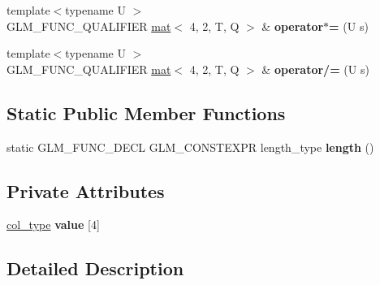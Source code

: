 \begin{DoxyCompactItemize}
\item 
\mbox{\label{structglm_1_1mat_3_014_00_012_00_01T_00_01Q_01_4_aca18c66a3af57e5d99e420867c77792a}} 
{\footnotesize template$<$typename U $>$ }\\G\+L\+M\+\_\+\+F\+U\+N\+C\+\_\+\+Q\+U\+A\+L\+I\+F\+I\+ER \hyperlink{structglm_1_1mat}{mat}$<$ 4, 2, T, Q $>$ \& {\bfseries operator$\ast$=} (U s)
\item 
\mbox{\label{structglm_1_1mat_3_014_00_012_00_01T_00_01Q_01_4_a654375437f4f6433308f1e41e5482c8f}} 
{\footnotesize template$<$typename U $>$ }\\G\+L\+M\+\_\+\+F\+U\+N\+C\+\_\+\+Q\+U\+A\+L\+I\+F\+I\+ER \hyperlink{structglm_1_1mat}{mat}$<$ 4, 2, T, Q $>$ \& {\bfseries operator/=} (U s)
\end{DoxyCompactItemize}
\subsection*{Static Public Member Functions}
\begin{DoxyCompactItemize}
\item 
\mbox{\label{structglm_1_1mat_3_014_00_012_00_01T_00_01Q_01_4_ab3b1d2d2d45c52698509f170c3e0d866}} 
static G\+L\+M\+\_\+\+F\+U\+N\+C\+\_\+\+D\+E\+CL G\+L\+M\+\_\+\+C\+O\+N\+S\+T\+E\+X\+PR length\+\_\+type {\bfseries length} ()
\end{DoxyCompactItemize}
\subsection*{Private Attributes}
\begin{DoxyCompactItemize}
\item 
\mbox{\label{structglm_1_1mat_3_014_00_012_00_01T_00_01Q_01_4_aa505bcd34286dbc23f599a6510908853}} 
\hyperlink{structglm_1_1vec_3_012_00_01T_00_01Q_01_4}{col\+\_\+type} {\bfseries value} \mbox{[}4\mbox{]}
\end{DoxyCompactItemize}


\subsection{Detailed Description}
